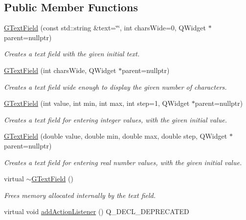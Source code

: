 \subsection*{Public Member Functions}
\begin{DoxyCompactItemize}
\item 
\mbox{\hyperlink{classGTextField_aab905bd4d32eef20c4b8ed701a8ec97f}{G\+Text\+Field}} (const std\+::string \&text=\char`\"{}\char`\"{}, int chars\+Wide=0, Q\+Widget $\ast$parent=nullptr)
\begin{DoxyCompactList}\small\item\em Creates a text field with the given initial text. \end{DoxyCompactList}\item 
\mbox{\hyperlink{classGTextField_a036419be062e4f447008a78dae22921c}{G\+Text\+Field}} (int chars\+Wide, Q\+Widget $\ast$parent=nullptr)
\begin{DoxyCompactList}\small\item\em Creates a text field wide enough to display the given number of characters. \end{DoxyCompactList}\item 
\mbox{\hyperlink{classGTextField_a4caf2f90e21e32abf032c99a8c3f8efb}{G\+Text\+Field}} (int value, int min, int max, int step=1, Q\+Widget $\ast$parent=nullptr)
\begin{DoxyCompactList}\small\item\em Creates a text field for entering integer values, with the given initial value. \end{DoxyCompactList}\item 
\mbox{\hyperlink{classGTextField_a8d164bf18d4dd4da6d5af0d23ee3a2c8}{G\+Text\+Field}} (double value, double min, double max, double step, Q\+Widget $\ast$parent=nullptr)
\begin{DoxyCompactList}\small\item\em Creates a text field for entering real number values, with the given initial value. \end{DoxyCompactList}\item 
virtual \mbox{\hyperlink{classGTextField_af35ec0a6daa2f8aa95d6b19e18fad662}{$\sim$\+G\+Text\+Field}} ()
\begin{DoxyCompactList}\small\item\em Frees memory allocated internally by the text field. \end{DoxyCompactList}\item 
virtual void \mbox{\hyperlink{classGInteractor_a02f20ea6edfa0671f31c4c648a253833}{add\+Action\+Listener}} () Q\+\_\+\+D\+E\+C\+L\+\_\+\+D\+E\+P\+R\+E\+C\+A\+T\+ED

\end{DoxyCompactItemize}
